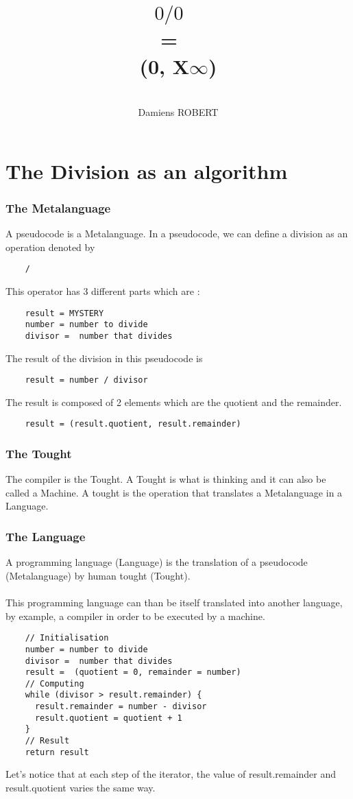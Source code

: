 \documentclass{article}
\title{$0/0$
~\\
= 
~\\
(0, X$\infty$)
}
\date{
}
\author{
~\\
Damiens ROBERT
}
\begin{document}
  \maketitle

  \tableofcontents

  \section{The Division as an algorithm}
  \subsubsection{The Metalanguage}
   A pseudocode is a Metalanguage. In a pseudocode, we can define a division as an operation denoted by 
   ~\\
  \begin{verbatim}
    /
  \end{verbatim}
   This operator has 3 different parts which are :
   ~\\
  \begin{verbatim}
    result = MYSTERY
    number = number to divide
    divisor =  number that divides
  \end{verbatim}
  The result of the division in this pseudocode is
  ~\\
  \begin{verbatim}
    result = number / divisor
  \end{verbatim}
  The result is composed of 2 elements which are the quotient and the remainder.
  ~\\
  \begin{verbatim}
    result = (result.quotient, result.remainder)
  \end{verbatim}
  \subsubsection{The Tought}
  The compiler is the Tought. A Tought is what is thinking and it can also be called a Machine. A tought is the operation that translates a Metalanguage in a Language.
  \subsubsection{The Language}
  A programming language (Language) is the translation of a pseudocode (Metalanguage) by human tought (Tought).
  ~\\
  ~\\
  This programming language can than be itself translated into another language, by example, a compiler in order to be executed by a machine.
  ~\\
  \begin{verbatim}
    // Initialisation
    number = number to divide
    divisor =  number that divides
    result =  (quotient = 0, remainder = number)
    // Computing
    while (divisor > result.remainder) {
      result.remainder = number - divisor
      result.quotient = quotient + 1
    }
    // Result
    return result
  \end{verbatim}
  Let's notice that at each step of the iterator, the value of result.remainder and result.quotient varies the same way.
\end{document}
